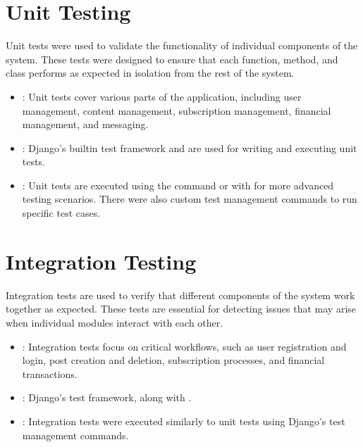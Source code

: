 \documentclass[letterpaper,10pt,english]{sphinxmanual}
\begin{document}
\section{Unit Testing}
\label{\detokenize{modules/testing:unit-testing}}
\sphinxAtStartPar
Unit tests were used to validate the functionality of individual components of the system. These tests were designed to ensure that each function, method, and class performs as expected in isolation from the rest of the system.
\begin{itemize}
\item {} 
\sphinxAtStartPar
{}: Unit tests cover various parts of the application, including user management, content management, subscription management, financial management, and messaging.

\item {} 
\sphinxAtStartPar
{}: Django’s built\sphinxhyphen{}in test framework and  are used for writing and executing unit tests.

\item {} 
\sphinxAtStartPar
{}: Unit tests are executed using the command  or with  for more advanced testing scenarios. There were also custom test management commands to run specific test cases.

\end{itemize}


\section{Integration Testing}
\label{\detokenize{modules/testing:integration-testing}}
\sphinxAtStartPar
Integration tests are used to verify that different components of the system work together as expected. These tests are essential for detecting issues that may arise when individual modules interact with each other.
\begin{itemize}
\item {} 
\sphinxAtStartPar
{}: Integration tests focus on critical workflows, such as user registration and login, post creation and deletion, subscription processes, and financial transactions.

\item {} 
\sphinxAtStartPar
{}: Django’s test framework, along with .

\item {} 
\sphinxAtStartPar
{}: Integration tests were executed similarly to unit tests using Django’s test management commands.

\end{itemize}
\end{document}
